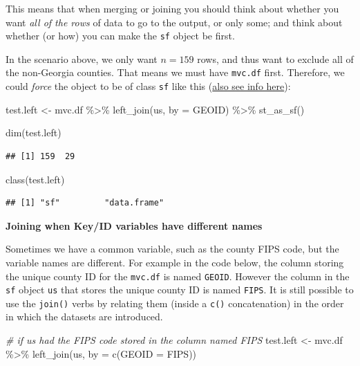 \documentclass[
]{book}
\newenvironment{Shaded}{\begin{snugshade}}{\end{snugshade}}
\newcommand{\AttributeTok}[1]{\textcolor[rgb]{0.77,0.63,0.00}{#1}}
\newcommand{\CommentTok}[1]{\textcolor[rgb]{0.56,0.35,0.01}{\textit{#1}}}
\newcommand{\FunctionTok}[1]{\textcolor[rgb]{0.00,0.00,0.00}{#1}}
\newcommand{\NormalTok}[1]{#1}
\newcommand{\OtherTok}[1]{\textcolor[rgb]{0.56,0.35,0.01}{#1}}
\newcommand{\SpecialCharTok}[1]{\textcolor[rgb]{0.00,0.00,0.00}{#1}}
\newcommand{\StringTok}[1]{\textcolor[rgb]{0.31,0.60,0.02}{#1}}
\begin{document}
This means that when merging or joining you should think about whether you want \emph{all of the rows} of data to go to the output, or only some; and think about whether (or how) you can make the \texttt{sf} object be first.

In the scenario above, we only want \(n=159\) rows, and thus want to exclude all of the non-Georgia counties. That means we must have \texttt{mvc.df} first. Therefore, we could \emph{force} the object to be of class \texttt{sf} like this (\protect\hyperlink{st-as-sf}{also see info here}):

\begin{Shaded}
\begin{Highlighting}[]
\NormalTok{test.left }\OtherTok{\textless{}{-}}\NormalTok{ mvc.df }\SpecialCharTok{\%\textgreater{}\%}
  \FunctionTok{left\_join}\NormalTok{(us, }\AttributeTok{by =} \StringTok{\textquotesingle{}GEOID\textquotesingle{}}\NormalTok{) }\SpecialCharTok{\%\textgreater{}\%}
  \FunctionTok{st\_as\_sf}\NormalTok{()}

\FunctionTok{dim}\NormalTok{(test.left)}
\end{Highlighting}
\end{Shaded}

\begin{verbatim}
## [1] 159  29
\end{verbatim}

\begin{Shaded}
\begin{Highlighting}[]
\FunctionTok{class}\NormalTok{(test.left)}
\end{Highlighting}
\end{Shaded}

\begin{verbatim}
## [1] "sf"         "data.frame"
\end{verbatim}

\textbf{Joining when Key/ID variables have different names}

Sometimes we have a common variable, such as the county FIPS code, but the variable names are different. For example in the code below, the column storing the unique county ID for the \texttt{mvc.df} is named \texttt{GEOID}. However the column in the \texttt{sf} object \texttt{us} that stores the unique county ID is named \texttt{FIPS}. It is still possible to use the \texttt{join()} verbs by relating them (inside a \texttt{c()} concatenation) in the order in which the datasets are introduced.

\begin{Shaded}
\begin{Highlighting}[]
\CommentTok{\# if us had the FIPS code stored in the column named \textquotesingle{}FIPS\textquotesingle{}}
\NormalTok{test.left }\OtherTok{\textless{}{-}}\NormalTok{ mvc.df }\SpecialCharTok{\%\textgreater{}\%}
  \FunctionTok{left\_join}\NormalTok{(us, }\AttributeTok{by =} \FunctionTok{c}\NormalTok{(}\StringTok{\textquotesingle{}GEOID\textquotesingle{}} \OtherTok{=} \StringTok{\textquotesingle{}FIPS\textquotesingle{}}\NormalTok{))}
\end{Highlighting}
\end{Shaded}
\end{document}

